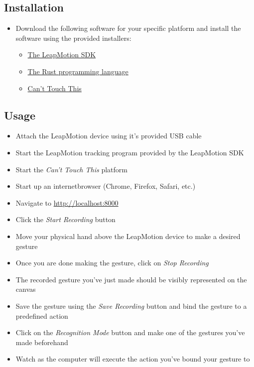 \documentclass[a4paper]{article}
\providecommand{\tightlist}{%
\setlength{\itemsep}{0pt}\setlength{\parskip}{0pt}}
\begin{document}


  \subsection{Installation}
  \begin{itemize}
    \tightlist
    \item Download the following software for your specific platform and install
      the software using the provided installers:
      \begin{itemize}
        \tightlist
        \item \href{https://developer.leapmotion.com/sdk/v2}{The LeapMotion SDK}
        \item \href{https://rust-lang.org}{The Rust programming language}
        \item \href{https://gitlab.com/timvisee/cant-touch-this}{Can't Touch This}
      \end{itemize}
  \end{itemize}

  \subsection{Usage}
  \begin{itemize}
    \tightlist
    \item Attach the LeapMotion device using it's provided USB cable
    \item Start the LeapMotion tracking program provided by the LeapMotion SDK
    \item Start the \textit{Can't Touch This} platform
    \item Start up an internetbrowser (Chrome, Firefox, Safari, etc.)
    \item Navigate to \url{http://localhost:8000}
    \item Click the \textit{Start Recording} button
    \item Move your physical hand above the LeapMotion device to make a desired
      gesture
    \item Once you are done making the gesture, click on \textit{Stop Recording}
    \item The recorded gesture you've just made should be visibly represented on
      the canvas
    \item Save the gesture using the \textit{Save Recording} button and bind the
      gesture to a predefined action
    \item Click on the \textit{Recognition Mode} button and make one of the
      gestures you've made beforehand
    \item Watch as the computer will execute the action you've bound your
      gesture to
  \end{itemize}
  \clearpage
\end{document}
